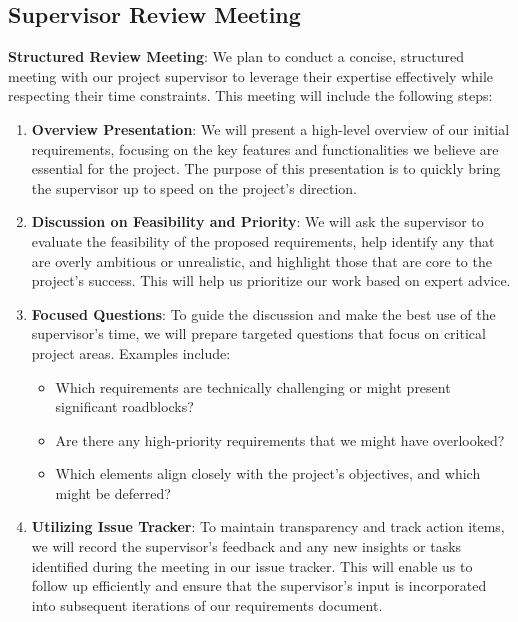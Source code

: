 \documentclass[12pt, titlepage]{article}
\begin{document}
\subsection*{Supervisor Review Meeting}

\textbf{Structured Review Meeting}: We plan to conduct a concise, structured meeting with our project supervisor to leverage their expertise effectively while respecting their time constraints. This meeting will include the following steps:

\begin{enumerate}
    \item \textbf{Overview Presentation}: We will present a high-level overview of our initial requirements, focusing on the key features and functionalities we believe are essential for the project. The purpose of this presentation is to quickly bring the supervisor up to speed on the project's direction.
    
    \item \textbf{Discussion on Feasibility and Priority}: We will ask the supervisor to evaluate the feasibility of the proposed requirements, help identify any that are overly ambitious or unrealistic, and highlight those that are core to the project’s success. This will help us prioritize our work based on expert advice.
    
    \item \textbf{Focused Questions}: To guide the discussion and make the best use of the supervisor’s time, we will prepare targeted questions that focus on critical project areas. Examples include:
    \begin{itemize}
        \item Which requirements are technically challenging or might present significant roadblocks?
        \item Are there any high-priority requirements that we might have overlooked?
        \item Which elements align closely with the project’s objectives, and which might be deferred?
    \end{itemize}
    
    \item \textbf{Utilizing Issue Tracker}: To maintain transparency and track action items, we will record the supervisor’s feedback and any new insights or tasks identified during the meeting in our issue tracker. This will enable us to follow up efficiently and ensure that the supervisor's input is incorporated into subsequent iterations of our requirements document.
\end{enumerate}
\end{document}
